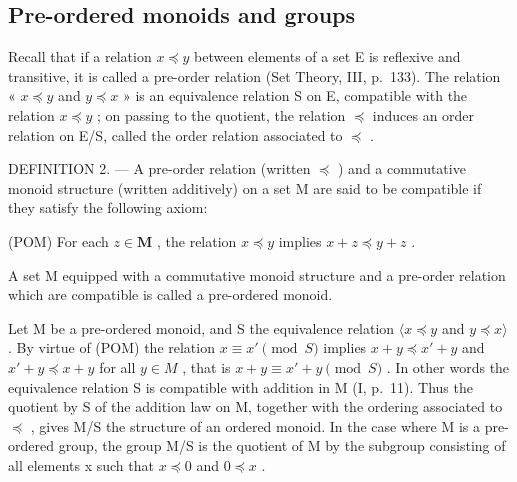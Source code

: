 \subsection{Pre-ordered monoids and groups}

Recall that if a relation \(x \preccurlyeq y\) between elements of a set E is reflexive and transitive, it is called a pre-order relation (Set Theory, III, p.~133). The relation « \(x \preccurlyeq y\) and \(y \preccurlyeq x\) » is an equivalence relation S on E, compatible with the relation \(x \preccurlyeq y\) ; on passing to the quotient, the relation \(\preccurlyeq\) induces an order relation on E/S, called the order relation associated to \(\preccurlyeq\) .

DEFINITION 2. --- A pre-order relation (written \(\preccurlyeq\) ) and a commutative monoid structure (written additively) on a set M are said to be compatible if they satisfy the following axiom:

(POM) For each \(z \in \mathbf{M}\) , the relation \(x \preccurlyeq y\) implies \(x + z \preccurlyeq y + z\) .

A set M equipped with a commutative monoid structure and a pre-order relation which are compatible is called a pre-ordered monoid.

Let M be a pre-ordered monoid, and S the equivalence relation \(\langle x \preccurlyeq y\) and \(y \preccurlyeq x \rangle\) . By virtue of (POM) the relation \(x \equiv x' \pmod{S}\) implies \(x + y \preccurlyeq x' + y\) and \(x' + y \preccurlyeq x + y\) for all \(y \in M\) , that is \(x + y \equiv x' + y \pmod{S}\) . In other words the equivalence relation S is compatible with addition in M (I, p.~11). Thus the quotient by S of the addition law on M, together with the ordering associated to \(\preccurlyeq\) , gives M/S the structure of an ordered monoid. In the case where M is a pre-ordered group, the group M/S is the quotient of M by the subgroup consisting of all elements x such that \(x \preccurlyeq 0\) and \(0 \preccurlyeq x\) .

